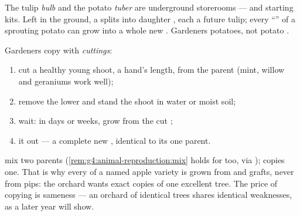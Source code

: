 \begin{example}\label{ex:g4:plants-without-seeds:bulbtuber}
The tulip \emph{bulb} and the potato
\emph{tuber} are underground storerooms --- and
starting kits. Left in the ground, a  splits into
daughter , each a future tulip; every ``'' of a
sprouting potato can grow into a whole new . Gardeners
 potatoes, not potato .
\end{example}

\begin{method}\label{met:g4:plants-without-seeds:cutting}
Gardeners copy  with
\emph{cuttings}:
\begin{enumerate}
  \item cut a healthy young shoot, a hand's length, from the
        parent  (mint, willow and geraniums work well);
  \item remove the lower  and stand the shoot in water
        or moist soil;
  \item wait: in days or weeks,  grow from the cut ;
  \item {} it out --- a complete new , identical to
        its one parent.
\end{enumerate}
\end{method}

\begin{remark}\label{rem:g4:plants-without-seeds:copy}
 mix two parents
(\cref{rem:g4:animal-reproduction:mix} holds for  too,
via );  copies one. That is why
every  of a named apple variety is grown from 
and grafts, never from pips: the orchard wants exact copies
of one excellent tree. The price of copying is sameness ---
an orchard of identical trees shares identical weaknesses,
as a later year will show.
\end{remark}

